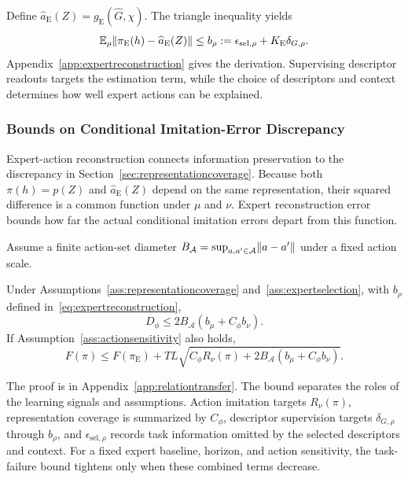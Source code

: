 Define $\widehat a_{\mathrm E}(Z)=g_{\mathrm E}(\widehat G,\chi)$.
The triangle inequality yields
\begin{equation}
 \mathbb E_\rho\lVert\pi_{\mathrm E}(h)-\widehat a_{\mathrm E}(Z)\rVert
 \le b_\rho
 :=\epsilon_{\mathrm{sel},\rho}+K_{\mathrm E}\delta_{G,\rho}.
 \label{eq:expertreconstruction}
\end{equation}
Appendix~\ref{app:expertreconstruction} gives the derivation.
Supervising descriptor readouts targets the estimation term, while the choice of descriptors and context determines how well expert actions can be explained.

\subsubsection{Bounds on Conditional Imitation-Error Discrepancy}
\label{sec:relationtransfer}
Expert-action reconstruction connects information preservation to the discrepancy in Section~\ref{sec:representationcoverage}.
Because both $\pi(h)=p(Z)$ and $\widehat a_{\mathrm E}(Z)$ depend on the same representation, their squared difference is a common function under $\mu$ and $\nu$.
Expert reconstruction error bounds how far the actual conditional imitation errors depart from this function.

Assume a finite action-set diameter $B_{\mathcal A}=\sup_{a,a'\in\mathcal A}\lVert a-a'\rVert$ under a fixed action scale.
\begin{proposition}
\label{prop:relationtransfer}
Under Assumptions~\ref{ass:representationcoverage} and~\ref{ass:expertselection}, with $b_\rho$ defined in~\eqref{eq:expertreconstruction},
\begin{equation}
 D_\phi\le 2B_{\mathcal A}(b_\mu+C_\phi b_\nu).
 \label{eq:relationdiscrepancybound}
\end{equation}
If Assumption~\ref{ass:actionsensitivity} also holds,
\begin{equation}
 F(\pi)\le F(\pi_{\mathrm E})
 +TL\sqrt{C_\phi R_\nu(\pi)+2B_{\mathcal A}(b_\mu+C_\phi b_\nu)}.
 \label{eq:relationtransferfailure}
\end{equation}
\end{proposition}
The proof is in Appendix~\ref{app:relationtransfer}.
The bound separates the roles of the learning signals and assumptions.
Action imitation targets $R_\nu(\pi)$, representation coverage is summarized by $C_\phi$, descriptor supervision targets $\delta_{G,\rho}$ through $b_\rho$, and $\epsilon_{\mathrm{sel},\rho}$ records task information omitted by the selected descriptors and context.
For a fixed expert baseline, horizon, and action sensitivity, the task-failure bound tightens only when these combined terms decrease.
